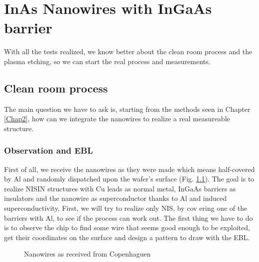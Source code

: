 \chapter{InAs Nanowires with InGaAs barrier}
\label{Chap4}

With all the tests realized, we know better about the clean room process and the plasma etching, so we can start the real process and measurements.
       
    \section{Clean room process}
        
        The main question we have to ask is, starting from the methods seen in Chapter \ref{Chap2}, how can we integrate the nanowires to realize a real measureable structure.
                
        \subsection{Observation and EBL}
        
        First of all, we receive the nanowires as they were made which means half-covered by Al and randomly dispatched upon the wafer's surface (Fig. \ref{NWfirst}). The goal is to realize NISIN structures with Cu leads as normal metal, InGaAs barriers as insulators and the nanowire as superconductor thanks to Al and induced superconductivity. First, we will try to realize only NIS, by cov ering one of the barriers with Al, to see if the process can work out. The first thing we have to do is to observe the chip to find some wire that seems good enough to be exploited, get their coordinates on the surface and design a pattern to draw with the EBL.
        
        \begin{figure}
            \centering
            \caption{Nanowires as received from Copenhaguen}
            \label{NWfirst}
        \end{figure}
        
